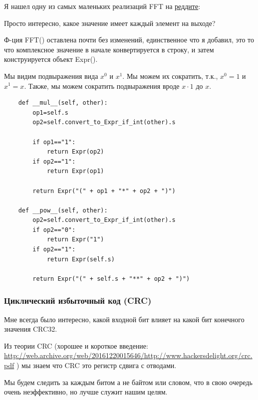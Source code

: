Я нашел одну из самых маленьких реализаций FFT на \href{https://www.reddit.com/r/Python/comments/1la4jp/understanding_the_fft_algorithm_with_python/}{реддите}:



Просто интересно, какое значение имеет каждый элемент на выходе?



Ф-ция FFT() оставлена почти без изменений, единственное что я добавил, это то что комплексное значение в начале конвертируется
в строку, и затем конструируется объект Expr().



Мы видим подвыражения вида $x^0$ и $x^1$.
Мы можем их сократить, т.к., $x^0=1$ и $x^1=x$.
Также, мы можем сократить подвыражения вроде $x \cdot 1$ до $x$.

\begin{lstlisting}
    def __mul__(self, other):
        op1=self.s
        op2=self.convert_to_Expr_if_int(other).s

        if op1=="1":
            return Expr(op2)
        if op2=="1":
            return Expr(op1)

        return Expr("(" + op1 + "*" + op2 + ")")

    def __pow__(self, other):
        op2=self.convert_to_Expr_if_int(other).s
        if op2=="0":
            return Expr("1")
        if op2=="1":
            return Expr(self.s)

        return Expr("(" + self.s + "**" + op2 + ")")
\end{lstlisting}



\subsubsection{Циклический избыточный код (\ac{CRC})}

Мне всегда было интересно, какой входной бит влияет на какой бит конечного значения CRC32.

Из теории \ac{CRC} (хорошее и короткое введение:
\url{http://web.archive.org/web/20161220015646/http://www.hackersdelight.org/crc.pdf}
) мы знаем что \ac{CRC} это регистр сдвига с отводами.

Мы будем следить за каждым битом а не байтом или словом, что в свою очередь очень неэффективно, но лучше служит нашим целям.

